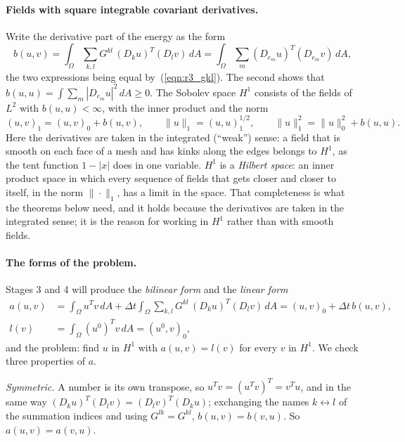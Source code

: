 \paragraph{Fields with square integrable covariant derivatives.} Write the derivative part of the energy as the form
\begin{equation*}
b(u, v) = \int_\Omega \sum_{k,l} G^{kl}\,(D_ku)^T(D_lv)\, dA = \int_\Omega \sum_m (D_{e_m}u)^T(D_{e_m}v)\, dA ,
\end{equation*}
the two expressions being equal by~(\ref{eqn:r3_gkl}). The second shows that $b(u, u) = \int\sum_m |D_{e_m}u|^2\, dA \ge 0$. The Sobolev space $H^1$ consists of the fields of $L^2$ with $b(u, u) < \infty$, with the inner product and the norm
\begin{equation*}
(u, v)_1 = (u, v)_0 + b(u, v), \qquad \|u\|_1 = (u, u)_1^{1/2}, \qquad \|u\|_1^2 = \|u\|_0^2 + b(u, u) .
\end{equation*}
Here the derivatives are taken in the integrated (``weak'') sense: a field that is smooth on each face of a mesh and has kinks along the edges belongs to $H^1$, as the tent function $1 - |x|$ does in one variable. $H^1$ is a \emph{Hilbert space}: an inner product space in which every sequence of fields that gets closer and closer to itself, in the norm $\|\cdot\|_1$, has a limit in the space. That completeness is what the theorems below need, and it holds because the derivatives are taken in the integrated sense; it is the reason for working in $H^1$ rather than with smooth fields.

\paragraph{The forms of the problem.} Stages 3 and 4 will produce the \emph{bilinear form} and the \emph{linear form}
\begin{equation}
\label{eqn:r3_bilinear}
\begin{aligned}
a(u, v) &= \int_\Omega u^Tv\, dA + \Delta t\int_\Omega \sum_{k,l} G^{kl}\,(D_ku)^T(D_lv)\, dA = (u, v)_0 + \Delta t\, b(u, v), \\
l(v) &= \int_\Omega (u^0)^Tv\, dA = (u^0, v)_0 ,
\end{aligned}
\end{equation}
and the problem: find $u$ in $H^1$ with $a(u, v) = l(v)$ for every $v$ in $H^1$. We check three properties of $a$.

\emph{Symmetric.} A number is its own transpose, so $u^Tv = (u^Tv)^T = v^Tu$, and in the same way $(D_ku)^T(D_lv) = (D_lv)^T(D_ku)$; exchanging the names $k \leftrightarrow l$ of the summation indices and using $G^{lk} = G^{kl}$, $b(u, v) = b(v, u)$. So $a(u, v) = a(v, u)$.

